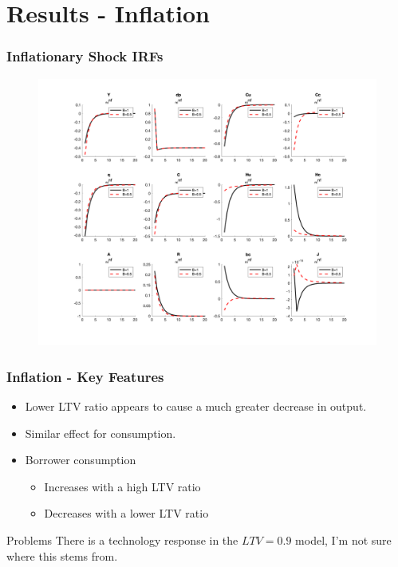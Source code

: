 \documentclass{beamer}
\begin{document}
\section{Results - Inflation}

\begin{frame}
	\frametitle{Inflationary Shock IRFs}
	
	\begin{figure}[H]\centering
  \includegraphics[scale=0.3]{../figs/_n_inf}
\end{figure}
	
\end{frame}

\begin{frame}
\frametitle{Inflation - Key Features}
\begin{itemize}
  \item Lower LTV ratio appears to cause a much greater decrease in output.
  \item Similar effect for consumption.
  \item Borrower consumption
 	\begin{itemize}
  \item Increases with a high LTV ratio
  \item Decreases with a lower LTV ratio
\end{itemize}

\end{itemize}

\begin{alertblock}{Problems}
 There is a technology response in the $LTV = 0.9$ model, I'm not sure where this stems from.
\end{alertblock}

	
\end{frame}
\end{document}
